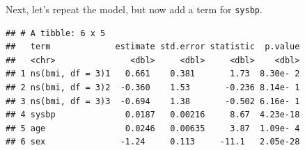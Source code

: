 \documentclass[
]{book}
\newenvironment{Shaded}{\begin{snugshade}}{\end{snugshade}}
\newcommand{\DataTypeTok}[1]{\textcolor[rgb]{0.13,0.29,0.53}{#1}}
\newcommand{\DecValTok}[1]{\textcolor[rgb]{0.00,0.00,0.81}{#1}}
\newcommand{\FloatTok}[1]{\textcolor[rgb]{0.00,0.00,0.81}{#1}}
\newcommand{\KeywordTok}[1]{\textcolor[rgb]{0.13,0.29,0.53}{\textbf{#1}}}
\newcommand{\NormalTok}[1]{#1}
\newcommand{\OperatorTok}[1]{\textcolor[rgb]{0.81,0.36,0.00}{\textbf{#1}}}
\newcommand{\StringTok}[1]{\textcolor[rgb]{0.31,0.60,0.02}{#1}}
\begin{document}
Next, let's repeat the model, but now add a term for \texttt{sysbp}.

\begin{Shaded}
\end{Shaded}

\begin{verbatim}
## # A tibble: 6 x 5
##   term             estimate std.error statistic  p.value
##   <chr>               <dbl>     <dbl>     <dbl>    <dbl>
## 1 ns(bmi, df = 3)1   0.661    0.381       1.73  8.30e- 2
## 2 ns(bmi, df = 3)2  -0.360    1.53       -0.236 8.14e- 1
## 3 ns(bmi, df = 3)3  -0.694    1.38       -0.502 6.16e- 1
## 4 sysbp              0.0187   0.00216     8.67  4.23e-18
## 5 age                0.0246   0.00635     3.87  1.09e- 4
## 6 sex               -1.24     0.113     -11.1   2.05e-28
\end{verbatim}

\begin{Shaded}
\end{Shaded}
\end{document}
